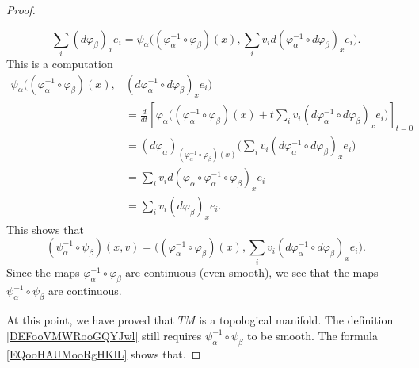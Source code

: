 \begin{proof}
\begin{enumerate}
\begin{equation}
			      \sum_i(d\varphi_{\beta})_xe_i=	\psi_{\alpha}\Big( (\varphi_{\alpha}^{-1}\circ\varphi_{\beta})(x),\sum_iv_i d(\varphi_{\alpha}^{-1}\circ d\varphi_{\beta})_xe_i   \Big).
		      \end{equation}
		      This is a computation
		      \begin{subequations}
			      \begin{align}
				      \psi_{\alpha}\Big( (\varphi_{\alpha}^{-1}\circ\varphi_{\beta})(x), & (d\varphi_{\alpha}^{-1}\circ d\varphi_{\beta})_xe_i \Big)                                                                                                                          \\
				                                                                         & =\frac{d}{dt} \left[ \varphi_{\alpha}\Big(     (\varphi_{\alpha}^{-1}\circ\varphi_{\beta})(x)+t\sum_iv_i(d\varphi_{\alpha}^{-1}\circ d\varphi_{\beta})_xe_i   \Big)  \right]_{t=0} \\
				                                                                         & =(d\varphi_{\alpha})_{(\varphi_{\alpha}^{-1}\circ \varphi_{\beta})(x)}\Big( \sum_iv_i(d\varphi_{\alpha}^{-1}\circ d\varphi_{\beta})_xe_i \Big)                                     \\
				                                                                         & =\sum_iv_id(\varphi_{\alpha}\circ\varphi_{\alpha}^{-1}\circ\varphi_{\beta})_xe_i                                                                                                   \\
				                                                                         & =\sum_iv_i(d\varphi_{\beta})_xe_i.
			      \end{align}
		      \end{subequations}
		      This shows that
		      \begin{equation}		\label{EQooHAUMooRgHKlL}
			      (\psi_{\alpha}^{-1}\circ\psi_{\beta})(x,v)=\Big( (\varphi_{\alpha}^{-1}\circ\varphi_{\beta})(x),\sum_iv_i(d\varphi_{\alpha}^{-1}\circ d\varphi_{\beta})_xe_i \Big).
		      \end{equation}
		      Since the maps \( \varphi_{\alpha}^{-1}\circ \varphi_{\beta}\) are continuous (even smooth), we see that the maps \( \psi_{\alpha}^{-1}\circ\psi_{\beta}\) are continuous.
	\end{enumerate}
	At this point, we have proved that \( TM\) is a topological manifold. The definition \ref{DEFooVMWRooGQYJwl} still requires \( \psi_{\alpha}^{-1}\circ\psi_{\beta}\) to be smooth. The formula \eqref{EQooHAUMooRgHKlL} shows that.
\end{proof}


